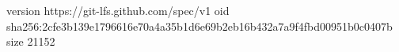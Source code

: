 version https://git-lfs.github.com/spec/v1
oid sha256:2cfe3b139e1796616e70a4a35b1d6e69b2eb16b432a7a9f4fbd00951b0c0407b
size 21152
